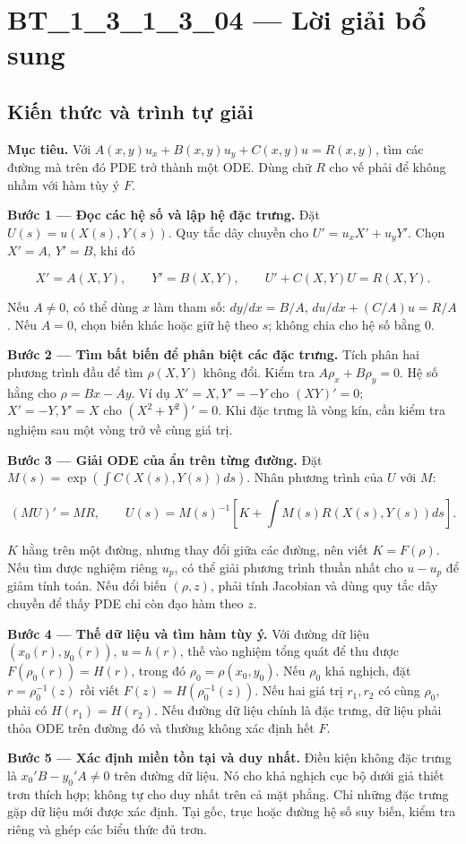 \documentclass[10pt,a4paper]{article}
\begin{document}
\section*{BT\_1\_3\_1\_3\_04 — Lời giải bổ sung}
\subsection*{Kiến thức và trình tự giải}
\textbf{Mục tiêu.} Với $A(x,y)u_x+B(x,y)u_y+C(x,y)u=R(x,y)$, tìm các đường mà trên đó PDE trở thành một ODE. Dùng chữ $R$ cho vế phải để không nhầm với hàm tùy ý $F$.

\textbf{Bước 1 — Đọc các hệ số và lập hệ đặc trưng.} Đặt $U(s)=u(X(s),Y(s))$. Quy tắc dây chuyền cho $U'=u_xX'+u_yY'$. Chọn $X'=A$, $Y'=B$, khi đó

\[
X'=A(X,Y),\qquad Y'=B(X,Y),\qquad U'+C(X,Y)U=R(X,Y).
\]

Nếu $A\ne0$, có thể dùng $x$ làm tham số: $dy/dx=B/A$, $du/dx+(C/A)u=R/A$. Nếu $A=0$, chọn biến khác hoặc giữ hệ theo $s$; không chia cho hệ số bằng 0.

\textbf{Bước 2 — Tìm bất biến để phân biệt các đặc trưng.} Tích phân hai phương trình đầu để tìm $\rho(X,Y)$ không đổi. Kiểm tra $A\rho_x+B\rho_y=0$. Hệ số hằng cho $\rho=Bx-Ay$. Ví dụ $X'=X,Y'=-Y$ cho $(XY)'=0$; $X'=-Y,Y'=X$ cho $(X^2+Y^2)'=0$. Khi đặc trưng là vòng kín, cần kiểm tra nghiệm sau một vòng trở về cùng giá trị.

\textbf{Bước 3 — Giải ODE của ẩn trên từng đường.} Đặt $M(s)=\exp(\int C(X(s),Y(s))ds)$. Nhân phương trình của $U$ với $M$:

\[
(MU)'=MR,\qquad
U(s)=M(s)^{-1}\left[K+\int M(s)R(X(s),Y(s))ds\right].
\]

$K$ hằng trên một đường, nhưng thay đổi giữa các đường, nên viết $K=F(\rho)$. Nếu tìm được nghiệm riêng $u_p$, có thể giải phương trình thuần nhất cho $u-u_p$ để giảm tính toán. Nếu đổi biến $(\rho,z)$, phải tính Jacobian và dùng quy tắc dây chuyền để thấy PDE chỉ còn đạo hàm theo $z$.

\textbf{Bước 4 — Thế dữ liệu và tìm hàm tùy ý.} Với đường dữ liệu $(x_0(r),y_0(r))$, $u=h(r)$, thế vào nghiệm tổng quát để thu được $F(\rho_0(r))=H(r)$, trong đó $\rho_0=\rho(x_0,y_0)$. Nếu $\rho_0$ khả nghịch, đặt $r=\rho_0^{-1}(z)$ rồi viết $F(z)=H(\rho_0^{-1}(z))$. Nếu hai giá trị $r_1,r_2$ có cùng $\rho_0$, phải có $H(r_1)=H(r_2)$. Nếu đường dữ liệu chính là đặc trưng, dữ liệu phải thỏa ODE trên đường đó và thường không xác định hết $F$.

\textbf{Bước 5 — Xác định miền tồn tại và duy nhất.} Điều kiện không đặc trưng là $x_0'B-y_0'A\ne0$ trên đường dữ liệu. Nó cho khả nghịch cục bộ dưới giả thiết trơn thích hợp; không tự cho duy nhất trên cả mặt phẳng. Chỉ những đặc trưng gặp dữ liệu mới được xác định. Tại gốc, trục hoặc đường hệ số suy biến, kiểm tra riêng và ghép các biểu thức đủ trơn.
\end{document}

